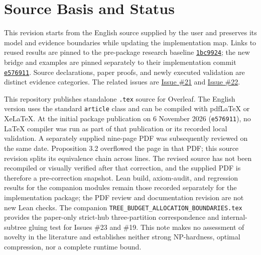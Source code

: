 \documentclass[11pt]{article}
\theoremstyle{remark}
\newcommand{\code}[1]{\nolinkurl{#1}}
\begin{document}
\section*{Source Basis and Status}
This revision starts from the English source supplied by the user and preserves its model and evidence boundaries while updating the implementation map.
Links to reused results are pinned to the pre-package research baseline
\href{https://github.com/huam54925-cpu/uav-routing-certification/commit/1bc992475a9bd515d77245e2bc0471e5ecab2fd5}{
\code{1bc9924}}; the new bridge and examples are pinned separately to their implementation commit
\href{https://github.com/huam54925-cpu/uav-routing-certification/commit/e5769113868b75a38016a30c2f6a8a016a14060e}{\code{e576911}}.
Source declarations, paper proofs, and newly executed validation are distinct evidence categories.
The related issues are
\href{https://github.com/huam54925-cpu/uav-routing-certification/issues/21}{Issue \#21}
and \href{https://github.com/huam54925-cpu/uav-routing-certification/issues/22}{Issue \#22}.

This repository publishes standalone \code{.tex} source for Overleaf. The English version uses the standard \code{article} class and can be compiled with pdfLaTeX or XeLaTeX.
At the initial package publication on 6 November 2026 (\code{e576911}), no LaTeX compiler was run as part of that publication or its recorded local validation.
A separately supplied nine-page PDF was subsequently reviewed on the same date. Proposition 3.2 overflowed the page in that PDF; this source revision splits its equivalence chain across lines.
The revised source has not been recompiled or visually verified after that correction, and the supplied PDF is therefore a pre-correction snapshot.
Lean build, axiom-audit, and regression results for the companion modules remain those recorded separately for the implementation package; the PDF review and documentation revision are not new Lean checks.
The companion \code{TREE_BUDGET_ALLOCATION_BOUNDARIES.tex} provides the paper-only strict-hub three-partition correspondence and internal-subtree gluing test for Issues \#23 and \#19.
This note makes no assessment of novelty in the literature and establishes neither strong NP-hardness, optimal compression, nor a complete runtime bound.
\end{document}
